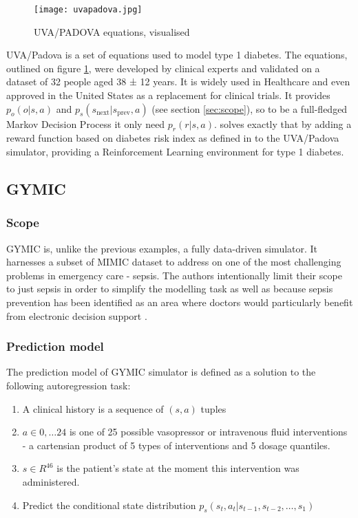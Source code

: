 \begin{figure}
    \centering
    \texttt{[image: uvapadova.jpg]}
    \caption{UVA/PADOVA equations, visualised}
    \label{fig:uvapadova}
\end{figure}

UVA/Padova \cite{sim-diabetes-fda} is a set of equations used to model type 1 diabetes.
The equations, outlined on figure \ref{fig:uvapadova}, were developed by clinical experts and validated on a dataset of 32 people aged 38 ± 12 years.
It is widely used in Healthcare and even approved in the United States as a replacement for clinical trials.
It provides $p_o(o | s, a)$ and $p_s(s_\text{next} | s_\text{prev}, a)$ (see section \ref{sec:scope}), so to be a full-fledged Markov Decision Process it only need $p_r(r|s,a)$.
\cite{simglucose} solves exactly that by adding a reward function based on diabetes risk index as defined in \cite{diabetesrisk} to the UVA/Padova simulator, providing a Reinforcement Learning environment for type 1 diabetes.

\subsection{GYMIC}
\label{sec:gymic}

\subsubsection{Scope}
GYMIC \cite{gymic} is, unlike the previous examples, a fully data-driven simulator. 
It harnesses a subset of MIMIC \cite{mimic} dataset to address on one of the most challenging problems in emergency care - sepsis.
The authors intentionally limit their scope to just sepsis in order to simplify the modelling task as well as because sepsis prevention has been identified as an area where doctors would particularly benefit from electronic decision support \cite{sepsis-motivation1,sepsis-motivation2}.

\subsubsection{Prediction model}
The prediction model of GYMIC simulator is defined as a solution to the following autoregression task:
\begin{enumerate}
    \item A clinical history is a sequence of $(s, a)$ tuples
    \item $a \in 0,\dots 24$ is one of 25 possible vasopressor or intravenous fluid interventions - a cartensian product of 5 types of interventions and 5 dosage quantiles. 
    \item $s \in R^{46}$ is the patient's state at the moment this intervention was administered.
    \item Predict the conditional state distribution $p_s(s_t, a_t | s_{t-1},s_{t-2},\dots,s_1)$
\end{enumerate}

